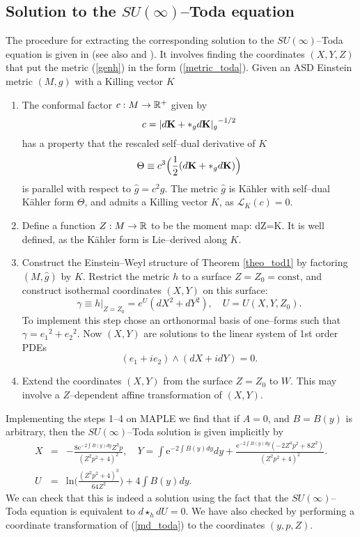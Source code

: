 \subsection{Solution to the $SU(\infty)$--Toda equation}
\label{steps_sec}
The procedure for extracting the corresponding solution to the $SU(\infty)$--Toda equation is given in \cite{Tod_note} 
(see also \cite{LeBrun} and \cite{DT}). It involves finding the coordinates $(X,Y,Z)$ that put the metric (\ref{genh}) in the 
form (\ref{metric_toda}). Given an ASD Einstein metric $(M, g)$ with a
Killing vector $K$
\begin{enumerate}
\item The conformal factor $c:M\rightarrow \mathbb{R}^+$  given by
\[
c={|d{\bf K}+*_g d{\bf K}|_{g}}^{-1/2}
\]
has a property that
the rescaled self--dual derivative of $K$
\[
\Theta\equiv c^3\Big(\frac{1}{2}(d{\bf K}+*_g d{\bf K})\Big)
\]
is parallel with respect to $\hat{g}=c^2 g$.
The metric $\hat{g}$ is K\"ahler with  self--dual 
K\"ahler form $\Theta$, and admits a Killing vector $K$, as
${\mathcal L}_K(c)=0$.
\item
Define a function $Z:M\rightarrow \mathbb{R}$ to be the moment map:
\be
\label{ztilde}
dZ=K\hook \Theta.
\ee
It is well defined, as the K\"ahler form is Lie--derived along $K$.
\item
Construct the Einstein--Weyl structure of Theorem \ref{theo_tod1}
by factoring $(M, \hat{g})$ by $K$. Restrict the metric $h$
to a surface $Z=Z_0=\mbox{const}$, and construct isothermal coordinates 
$(X, Y)$ on this surface:
\[
\gamma\equiv h|_{Z=Z_0}=e^{U}(dX^2+dY^2), \quad U=U(X, Y, Z_0).
\]
To implement this step chose an orthonormal basis of one--forms
such that $\gamma= {e_1}^2+{e_2}^2$. Now $(X, Y)$ are solutions to the linear
system of 1st order PDEs
\[
(e_1+ie_2)\wedge (dX+idY)=0.
\]
\item Extend the coordinates $(X, Y)$ from the surface $Z=Z_0$ to $W$. This may
involve a $Z$--dependent affine transformation of $(X, Y)$.
\end{enumerate}
Implementing the steps 1--4 on MAPLE we find that if $A=0$, and $B=B(y)$ 
is arbitrary, then the $SU(\infty)$--Toda solution is given implicitly by
\begin{eqnarray}
\label{toda_implicit1}
 X&=&-\frac{8\mathrm{e}^{-2\int{B(y)dy}}Z^3p}{(Z^2p^2+4)^2},\quad
Y=\int{\mathrm{e}^{-2\int{B(y)dy}}dy}+\frac{\mathrm{e}^{-2\int{B(y)dy}}(-2Z^4p^2+8Z^2)}{(Z^2p^2+4)^2}.\nonumber\\
U&=&\mathrm{ln}\bigg(\frac{(Z^2p^2+4)^3}{64Z^2}\bigg)+4\int{B(y)dy}.
\end{eqnarray}
We can check that this is indeed a solution using the fact that the $SU(\infty)$--Toda equation is equivalent to 
$d\star_h dU=0$. We have also checked by performing a coordinate transformation of (\ref{md_toda}) to the coordinates $(y,p,Z)$.
